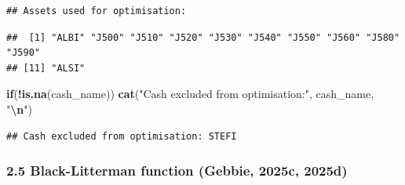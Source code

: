 \documentclass[
  12pt,
]{article}
\newenvironment{Shaded}{\begin{snugshade}}{\end{snugshade}}
\newcommand{\ControlFlowTok}[1]{\textcolor[rgb]{0.13,0.29,0.53}{\textbf{#1}}}
\newcommand{\FunctionTok}[1]{\textcolor[rgb]{0.13,0.29,0.53}{\textbf{#1}}}
\newcommand{\NormalTok}[1]{#1}
\newcommand{\SpecialCharTok}[1]{\textcolor[rgb]{0.81,0.36,0.00}{\textbf{#1}}}
\newcommand{\StringTok}[1]{\textcolor[rgb]{0.31,0.60,0.02}{#1}}
\begin{document}
\begin{verbatim}
## Assets used for optimisation:
\end{verbatim}

\begin{verbatim}
##  [1] "ALBI" "J500" "J510" "J520" "J530" "J540" "J550" "J560" "J580" "J590"
## [11] "ALSI"
\end{verbatim}

\begin{Shaded}
\begin{Highlighting}[]
\ControlFlowTok{if}\NormalTok{(}\SpecialCharTok{!}\FunctionTok{is.na}\NormalTok{(cash\_name)) }\FunctionTok{cat}\NormalTok{(}\StringTok{"Cash excluded from optimisation:"}\NormalTok{, cash\_name, }\StringTok{"}\SpecialCharTok{\textbackslash{}n}\StringTok{"}\NormalTok{)}
\end{Highlighting}
\end{Shaded}

\begin{verbatim}
## Cash excluded from optimisation: STEFI
\end{verbatim}

\subsubsection{2.5 Black-Litterman function (Gebbie, 2025c,
2025d)}\label{black-litterman-function-tim_btmlx-tim_prep}
\end{document}
